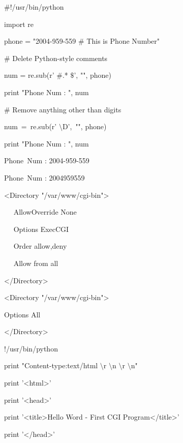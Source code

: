 \noindent 
 $  \#  $!/usr/bin/python \par
\noindent 
import re \par
\vspace{12pt}
\noindent 
phone = "2004-959-559  $  \#  $ This is Phone Number" \par
\vspace{12pt}
\noindent 
 $  \#  $ Delete Python-style comments \par
\noindent 
num = re.sub(r' $  \#  $.* $  \$  $', "", phone) \par
\noindent 
print "Phone Num : ", num \par
\vspace{12pt}
\noindent 
 $  \#  $ Remove anything other than digits \par
\noindent 
num~=~re.sub(r' $  \setminus  $D',~"", phone)     \par
\noindent 
print "Phone Num : ", num \par
\vspace{12pt}
\noindent 
Phone~Num :  2004-959-559 \par
\noindent 
Phone~Num :  2004959559 \par
\vspace{12pt}
\noindent 
<Directory "/var/www/cgi-bin"> \par
\noindent 
~~ AllowOverride None \par
\noindent 
~~ Options ExecCGI \par
\noindent 
~~ Order allow,deny \par
\noindent 
~~ Allow from all \par
\noindent 
</Directory> \par
\vspace{12pt}
\noindent 
<Directory "/var/www/cgi-bin"> \par
\noindent 
Options All \par
\noindent 
</Directory> \par
\vspace{12pt}
\noindent 
!/usr/bin/python \par
\vspace{12pt}
\noindent 
print "Content-type:text/html $  \setminus  $r $  \setminus  $n $  \setminus  $r $  \setminus  $n" \par
\noindent 
print '<html>' \par
\noindent 
print '<head>' \par
\noindent 
print '<title>Hello Word - First CGI Program</title>' \par
\noindent 
print '</head>' \par
